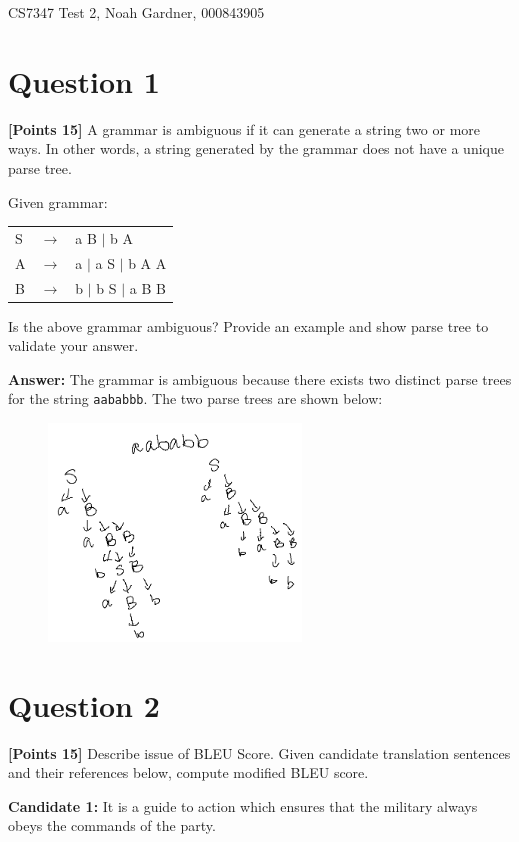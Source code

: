 \documentclass[12pt]{article}
\begin{document}
CS7347 Test 2, Noah Gardner, 000843905\n

\section*{Question 1}
\textbf{[Points 15]} A grammar is ambiguous if it can generate a string two or
more ways. In other words, a string generated by the grammar does not have a
unique parse tree.

Given grammar:

\begin{tabular}{lll}
      S & $\rightarrow$ & a B $|$ b A         \\
      A & $\rightarrow$ & a $|$ a S $|$ b A A \\
      B & $\rightarrow$ & b $|$ b S $|$ a B B \\
\end{tabular}

Is the above grammar ambiguous? Provide an example and show parse tree to
validate your answer.

\textbf{Answer:} The grammar is ambiguous because there exists two distinct
parse trees for the string \verb/aababbb/. The two parse trees are shown below:

\begin{figure}[!ht]
      \centering
      \includegraphics[width=0.6\textwidth]{assets/test2/p1.png}
\end{figure}


\newpage
\section*{Question 2}
\textbf{[Points 15]} Describe issue of BLEU Score. Given candidate translation
sentences and their references below, compute modified BLEU score.

\noindent\textbf{Candidate 1:} It is a guide to action which ensures that the military
always obeys the commands of the party.
\end{document}
